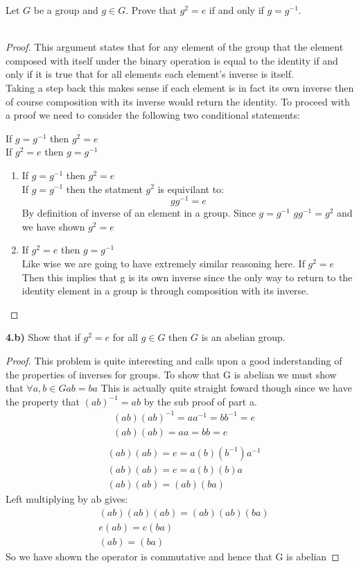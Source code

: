 \documentclass[11pt]{amsart}
\theoremstyle{definition}  %
\begin{document}
 Let $G$ be a group and $g \in G$. Prove that $g^2 = e$ if and only if $g = g^{-1}$. \\\\
\begin{proof}
This argument states that for any element of the group that the element composed with itself under the binary operation is equal to the identity if and only if it is true that for all elements each element's inverse is itself. \\
Taking a step back this makes sense if each element is in fact its own inverse then of course composition with its inverse would return the identity. To proceed with a proof we need to consider the following two conditional statements:
\begin{center}
  If $g=g^{-1}$ then $g^2=e$\\
  If $g^2=e$ then $g=g^{-1}$
\end{center}
\begin{enumerate}
  \item If $g=g^{-1}$ then $g^2=e$\\
  If $g=g^{-1}$ then the statment $g^2$ is equivilant to:
  \[
    gg^{-1}=e
  \]
  By definition of inverse of an element in a group. Since $g=g^{-1}$ $gg^{-1}=g^2$ and we have shown $g^2=e$
  \item If $g^2=e$ then $g=g^{-1}$\\
  Like wise we are going to have extremely similar reasoning here. If $g^2=e$ Then this implies that g is its own inverse since the only way to return to the identity element in a group is through composition with its inverse.
\end{enumerate}
\end{proof}
\noindent\makebox[\linewidth]{\rule{\paperwidth}{0.4pt}}
{\bf 4.b)} Show that if $g^2 = e$ for all $g \in G$ then $G$ is an abelian group. \\
\begin{proof}
This problem is quite interesting and calls upon a good inderstanding of the properties of inverses for groups. To show that G is abelian we must show that $\forall a,b \in G ab=ba$ This is actually quite straight foward though since we have the property that $(ab)^{-1}=ab$ by the sub proof of part a. \\
\begin{align*}
  &(ab)(ab)^{-1}=aa^{-1}=bb^{-1}=e\\
  &(ab)(ab)=aa=bb=e\\
\end{align*}
\begin{align*}
  &(ab)(ab)=e=a(b)(b^{-1})a^{-1}\\
  &(ab)(ab)=e=a(b)(b)a\\
  &(ab)(ab)=(ab)(ba)
\end{align*}
Left multiplying by ab gives:
\begin{align*}
    &(ab)(ab)(ab)=(ab)(ab)(ba)\\
    &e(ab)=e(ba)\\
    &(ab)=(ba)
\end{align*}
So we have shown the operator is commutative and hence that G is abelian
\end{proof}
\end{document}
